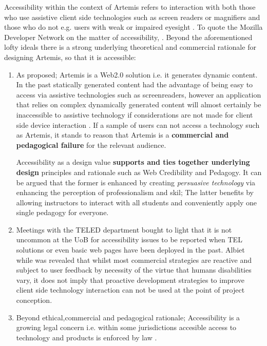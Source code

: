 Accessibility within the context of Artemis refers to interaction with both those who use assistive client side technologies such as screen readers or magnifiers \cite{MozillaDeveloperNetworka} and those who do not e.g. users with weak or impaired eyesight \cite{W3Cb}. To quote the Mozilla Developer Network on the matter of accessibility, . Beyond the aforementioned lofty ideal\textquotesingle s there is a strong underlying theoretical and commercial rationale for designing Artemis, so that it is accessible:

\begin{enumerate}

    \item As proposed; Artemis is a Web2.0 solution i.e. it generates dynamic content. In the past statically generated content had the advantage of being easy to access via assistive technologies such as screenreaders, however an application that relies on complex dynamically generated content will almost certainly be inaccessible to assistive technology if considerations are not made for client side device interaction \cite{MozillaDeveloperNetwork}. If a sample of users can not access a technology such as Artemis, it stands to reason that Artemis is a \textbf{commercial and pedagogical failure} for the relevant audience.
    
    Accessibility as a design value \textbf{supports and ties together underlying design} principles and rationale such as Web Credibility and Pedagogy. It can be argued that the former is enhanced by creating \textit{persuasive technology} via enhancing the perception of professionalism and skil; The latter benefits by allowing instructors to interact with all students and conveniently apply one single pedagogy for everyone.
    
    \item Meetings with the TELED department bought to light that it is not uncommon at the UoB for accessibility issues to be reported when TEL solutions or even basic web pages have been deployed in the past. Albiet while was revealed that whilst most commercial strategies are reactive and subject to user feedback by necessity of the virtue that humans disabilities vary, it does not imply that proactive development strategies to improve client side technology interaction can not be used at the point of project conception\cite{W3C}.
    
    \item Beyond ethical,commercial and pedagogical rationale; Accessibility is a growing legal concern i.e. within some jurisdictions accesible access to technology and products is enforced by law  \cite{Network}.
    

    
\end{enumerate}

